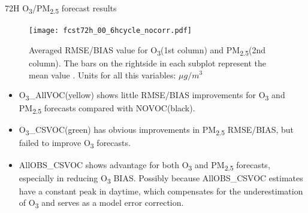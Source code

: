 \documentclass[final]{beamer}
\newlength{\colwidth}
\begin{document}
\begin{frame}[t]
\begin{columns}[t]
\begin{column}{\colwidth}
\begin{alertblock}{72H O\textsubscript{3}/PM\textsubscript{2.5} forecast results}
                \begin{figure}
                  \begin{minipage}[c]{0.8\textwidth}
                    \texttt{[image: fcst72h\_00\_6hcycle\_nocorr.pdf]}
                  \end{minipage}\hfill
                  \begin{minipage}[c]{0.18\textwidth}
                    \caption{Averaged RMSE/BIAS value for O\textsubscript{3}(1st column) and PM\textsubscript{2.5}(2nd column). The bars on the rightside in each subplot represent the mean value . Units for all this variables: $\mu g/m^3$}    
                    \label{fcst_result}
                  \end{minipage}
                \end{figure}
                
                \begin{itemize}
                    \item O\textsubscript{3}\_AllVOC(yellow) shows little RMSE/BIAS improvements for O\textsubscript{3} and PM\textsubscript{2.5} forecasts compared with NOVOC(black). 
                    \item O\textsubscript{3}\_CSVOC(green) has obvious improvements in PM\textsubscript{2.5} RMSE/BIAS, but failed to improve O\textsubscript{3} forecasts.
                    
                    \item AllOBS\_CSVOC shows advantage for both O\textsubscript{3} and PM\textsubscript{2.5} forecasts, especially in reducing O\textsubscript{3} BIAS. Possibly because AllOBS\_CSVOC estimates have a constant peak in daytime, which compensates for the underestimation of O\textsubscript{3} and serves as a model error correction.
                \end{itemize}
			\end{alertblock}
   

\end{column}
\end{columns}
\end{frame}
\end{document}
